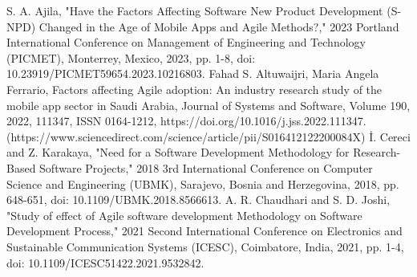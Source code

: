 \documentclass[conference]{IEEEtran}
\begin{document}
\begin{thebibliography}{00}
     S. A. Ajila, "Have the Factors Affecting Software New Product Development (S-NPD) Changed in the Age of Mobile Apps and Agile Methods?," 2023 Portland International Conference on Management of Engineering and Technology (PICMET), Monterrey, Mexico, 2023, pp. 1-8, doi: 10.23919/PICMET59654.2023.10216803.
     Fahad S. Altuwaijri, Maria Angela Ferrario, Factors affecting Agile adoption: An industry research study of the mobile app sector in Saudi Arabia,
    Journal of Systems and Software,
    Volume 190, 2022, 111347, ISSN 0164-1212, https://doi.org/10.1016/j.jss.2022.111347. (https://www.sciencedirect.com/science/article/pii/S016412122200084X)
     İ. Cereci and Z. Karakaya, "Need for a Software Development Methodology for Research-Based Software Projects," 2018 3rd International Conference on Computer Science and Engineering (UBMK), Sarajevo, Bosnia and Herzegovina, 2018, pp. 648-651, doi: 10.1109/UBMK.2018.8566613.
     A. R. Chaudhari and S. D. Joshi, "Study of effect of Agile software development Methodology on Software Development Process," 2021 Second International Conference on Electronics and Sustainable Communication Systems (ICESC), Coimbatore, India, 2021, pp. 1-4, doi: 10.1109/ICESC51422.2021.9532842.
    \end{thebibliography}
\end{document}

